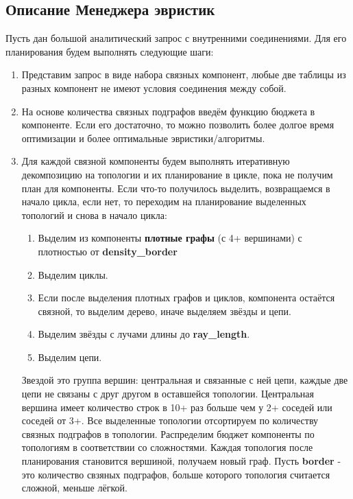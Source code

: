 \documentclass[12pt]{article}
\begin{document}
\begin{flushleft}
\section*{Описание Менеджера эвристик}

Пусть дан большой аналитический запрос с внутренними соединениями. Для его планирования будем выполнять 
следующие шаги:
\begin{enumerate}
    \item Представим запрос в виде набора связных компонент, любые две таблицы из разных компонент не имеют условия соединения между собой. 
    \item На основе количества связных подграфов введём функцию бюджета в компоненте. Если его достаточно, то можно позволить более долгое время оптимизации
    и более оптимальные эвристики/алгоритмы.
    \item Для каждой связной компоненты будем выполнять итеративную декомпозицию на топологии и их планирование в цикле, пока не получим план для компоненты. 
    Если что-то получилось выделить, возвращаемся в начало цикла, если нет, то переходим на планирование выделенных топологий и снова в начало цикла:
    \begin{enumerate}
        \item Выделим из компоненты \textbf{плотные графы} (с 4+ вершинами) с плотностью от \textbf{density\_border}
        \item Выделим циклы.
        \item Если после выделения  плотных графов и циклов, компонента остаётся связной, то выделим дерево, иначе выделяем звёзды и цепи.
        \item Выделим звёзды с лучами длины до \textbf{ray\_length}.
        \item Выделим цепи.
    \end{enumerate}
    Звездой это группа вершин: центральная и связанные с ней цепи, каждые две цепи не связаны с друг другом в оставшейся топологии. 
    Центральная вершина имеет количество строк в 10+ раз больше чем у 2+ соседей или соседей от 3+.
    \newline
    Все выделенные топологии  отсортируем по количеству связных подграфов в топологии.
    Распределим бюджет компоненты по топологиям в соответствии со сложностями. Каждая топология после планирования становится вершиной, получаем новый граф.
    \newline
    Пусть \textbf{border} - это количество свзяных подграфов, больше которого топология считается сложной, меньше лёгкой.

\end{enumerate}
\end{flushleft}
\end{document}
